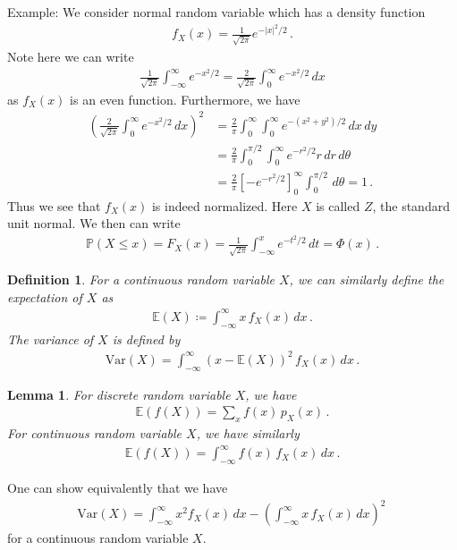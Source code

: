 \documentclass[11pt, onesided]{book}
\theoremstyle{break}
\theoremstyle{break}
\newtheorem{lem}{Lemma}[thm]
\newtheorem{defn}{Definition}[thm]
\newcommand{\example}{\color{green}Example: \color{black}}
\begin{document}
\example We consider normal random variable which has a density function
\begin{align*}
f_X(x) = \frac{1}{\sqrt{2\pi}}e^{-|x|^2/2}\,.
\end{align*}
Note here we can write
\begin{align*}
\frac{1}{\sqrt{2\pi}}\int_{-\infty}^\infty e^{-x^2/2} = \frac{2}{\sqrt{2\pi}}\int_0^\infty e^{-x^2/2}\, dx 
\end{align*}
as $f_X(x)$ is an even function. Furthermore, we have
\begin{align*}
\left(  \frac{2}{\sqrt{2\pi}}\int_0^\infty e^{-x^2/2}\, dx \right)^2 
&= \frac{2}{\pi}\int_0^\infty\int_0^\infty e^{-(x^2+y^2)/2}\, dx\,dy\\
&= \frac{2}{\pi}\int_0^{\pi/2}\int_0^\infty e^{-r^2/2}r\, dr\,d\theta\\
&= \frac{2}{\pi}\left[-e^{-r^2/2}\right]^\infty_0 \int_0^{\pi/2}\,d\theta = 1\,.
\end{align*}
Thus we see that $f_X(x)$ is indeed normalized. Here $X$ is called $Z$, the standard unit normal. We then can write
\begin{align*}
\mathbb{P}(X\leq x) = F_X(x) = \frac{1}{\sqrt{2\pi}}\int_{-\infty}^x e^{-t^2/2}\, dt = \Phi(x)\,.
\end{align*}
\begin{defn}
For a continuous random variable $X$, we can similarly define the expectation of $X$ as
\begin{align*}
\mathbb{E}(X) \coloneqq \int_{-\infty}^\infty x\, f_X(x) \, dx\,.
\end{align*}
The variance of $X$ is defined by
\begin{align*}
\text{Var}(X) = \int_{-\infty}^\infty \left(x-\mathbb{E}(X) \right)^2\, f_X(x) \, dx\,.
\end{align*}
\end{defn}
\begin{lem}
For discrete random variable $X$, we have
\begin{align*}
\mathbb{E}(f(X)) = \sum_x f(x) \, p_X(x)\,.
\end{align*}
For continuous random variable $X$, we have similarly
\begin{align*}
\mathbb{E}(f(X)) = \int_{-\infty}^\infty f(x)\, f_X(x)\, dx\,.
\end{align*}
\end{lem}
One can show equivalently that we have
\begin{align*}
\text{Var}(X) = \int_{-\infty}^\infty x^2 f_X(x) \, dx - \left( \int_{-\infty}^\infty x\, f_X(x)\, dx\right)^2\,
\end{align*}
for a continuous random variable $X$.\\
\end{document}
